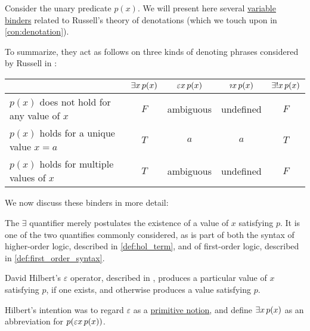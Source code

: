 \begin{concept}\label{con:description_operator}
  Consider the unary predicate \( p(x) \). We will present here several \hyperref[con:variable_binding]{variable binders} related to Russell's theory of denotations (which we touch upon in \cref{con:denotation}).

  To summarize, they act as follows on three kinds of denoting phrases considered by Russell in \cite{Russell1905OnDenoting}:
  \begin{center}
    \begin{tabular}{l c c c c}
      \toprule
                                                        & \( \qexists* x p(x) \) & \( \quantifier \varepsilon x p(x) \) & \( \quantifier \rotiota x p(x) \) & \( \qExists* x p(x) \) \\
      \midrule
      \( p(x) \) does not hold for any value of \( x \) & \( F \)                & ambiguous                            & undefined                         & \( F \) \\
      \( p(x) \) holds for a unique value \( x = a \)   & \( T \)                & \( a \)                              & \( a \)                           & \( T \) \\
      \( p(x) \) holds for multiple values of \( x \)   & \( T \)                & ambiguous                            & undefined                         & \( F \) \\
      \bottomrule
    \end{tabular}
  \end{center}

  We now discuss these binders in more detail:
  \begin{thmenum}
     The \( \exists \) quantifier merely postulates the existence of a value of \( x \) satisfying \( p \). It is one of the two quantifies commonly considered, as is part of both the syntax of higher-order logic, described in \cref{def:hol_term}, and of first-order logic, described in \cref{def:first_order_syntax}.

     David Hilbert's \( \varepsilon \) operator, described in \cite{Leisenring1969MathematicalLogic}, produces a particular value of \( x \) satisfying \( p \), if one exists, and otherwise produces a value  satisfying \( p \).

    Hilbert's intention was to regard \( \varepsilon \) as a \hyperref[con:primitive_notion]{primitive notion}, and define \( \qexists* x p(x) \) as an abbreviation for \( p(\quantifier \varepsilon x p(x)) \).


\end{thmenum}
\end{concept}
